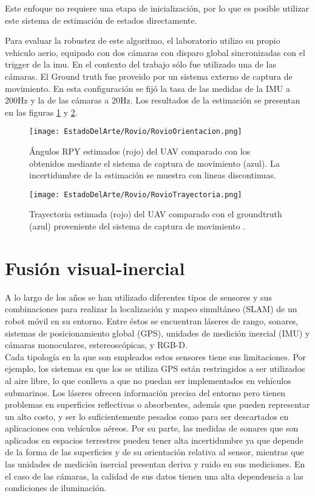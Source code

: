 Este enfoque no requiere una etapa de inicialización, por lo que es posible utilizar este sistema de estimación de estados directamente.


Para evaluar la robustez de este algoritmo, el laboratorio utilizo su propio vehiculo aerio, equipado con dos cámaras con disparo global sincronizadas con el trigger de la imu. En el contexto del trabajo sólo fue utilizado una de las cámaras. El Ground truth fue proveido por un sistema externo de captura de movimiento. En esta configuración se fijó la tasa de las medidas de la IMU a 200Hz y la de las cámaras a 20Hz. Los resultados de la estimación se presentan en las figuras \ref{fig:RovioOrientacion} y  \ref{fig:RovioTrayectoria}.



\begin{figure}[H]
	\centering
	\texttt{[image: EstadoDelArte/Rovio/RovioOrientacion.png]}
	\caption{Ángulos RPY estimados (rojo) del UAV comparado con los obtenidos mediante el sistema de captura de movimiento (azul). La incertidumbre de la estimación se muestra con lineas discontinuas. }
	\label{fig:RovioOrientacion}
\end{figure}


\begin{figure}[H]
	\centering
	\texttt{[image: EstadoDelArte/Rovio/RovioTrayectoria.png]}
	\caption{Trayectoria estimada (rojo) del UAV comparado con el groundtruth (azul) proveniente del sistema de captura de movimiento .}
	\label{fig:RovioTrayectoria}
\end{figure}




\section{Fusión visual-inercial }
A lo largo de los años se han utilizado diferentes tipos de sensores y sus combinaciones para realizar la localización y mapeo simultáneo (SLAM) de un robot móvil en su entorno. Entre éstos se encuentran láseres de rango, sonares, sistemas de posicionamiento global (GPS), unidades de medición inercial (IMU) y cámaras monoculares, estereoscópicas, y RGB-D.\\

Cada tipología en la que son empleados estos sensores tiene sus limitaciones. Por ejemplo, los sistemas en que los se utiliza GPS están restringidos a ser utilizados al aire libre, lo que conlleva a que no puedan ser implementados en vehículos submarinos. Los láseres ofrecen información precisa del entorno pero tienen problemas en superficies reflectivas o absorbentes, además que pueden representar un alto costo,  y  ser lo suficientemente pesados como para ser descartados en aplicaciones con  vehículos aéreos. Por su parte, las medidas de sonares que son aplicados en espacios terrestres pueden tener alta incertidumbre ya que depende de la forma de las superficies y de su orientación relativa al sensor, mientras que las unidades de medición inercial presentan deriva y ruido en sus mediciones. En el caso de las cámaras, la  calidad de sus datos tienen una alta dependencia a las condiciones de iluminación. \\

